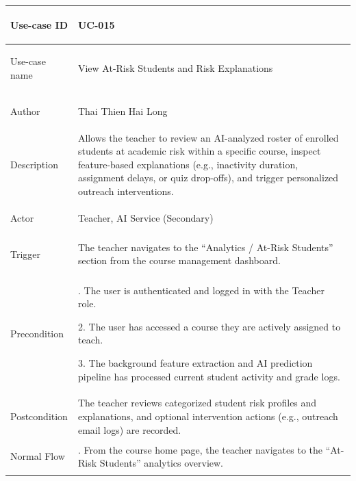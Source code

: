 {
\renewcommand{\arraystretch}{1.1}
\setlength{\tabcolsep}{8pt}
\begin{longtable}{|>{\bfseries\raggedright\arraybackslash}p{}|>{\raggedright\arraybackslash}p{}|}
\hline
Use-case ID & UC-015 \\ \hline
Use-case name & View At-Risk Students and Risk Explanations \\ \hline
Author & Thai Thien Hai Long \\ \hline
Description &
Allows the teacher to review an AI-analyzed roster of enrolled students at academic risk within a specific course, inspect feature-based explanations (e.g., inactivity duration, assignment delays, or quiz drop-offs), and trigger personalized outreach interventions. \\ \hline
Actor & Teacher, AI Service (Secondary) \\ \hline
Trigger &
The teacher navigates to the ``Analytics / At-Risk Students'' section from the course management dashboard. \\ \hline
Precondition &
1. The user is authenticated and logged in with the Teacher role. \par
2. The user has accessed a course they are actively assigned to teach. \par
3. The background feature extraction and AI prediction pipeline has processed current student activity and grade logs. \\ \hline
Postcondition &
The teacher reviews categorized student risk profiles and explanations, and optional intervention actions (e.g., outreach email logs) are recorded. \\ \hline
Normal Flow &
1. From the course home page, the teacher navigates to the ``At-Risk Students'' analytics overview. \par

\end{longtable}}

